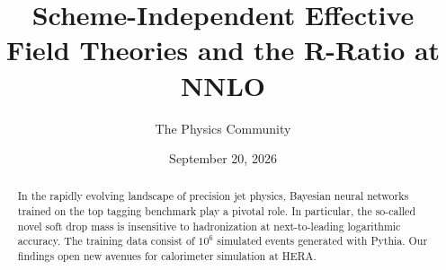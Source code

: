 \documentclass[11pt]{article}
\title{Scheme-Independent Effective Field Theories and the R-Ratio at NNLO}
\author{The Physics Community}
\date{September 20, 2026}
\numberwithin{equation}{section}
\theoremstyle{definition}
\theoremstyle{remark}
\begin{document}
\maketitle
\begin{abstract}
In the rapidly evolving landscape of precision jet physics, Bayesian
neural networks trained on the top tagging benchmark play a pivotal
role. In particular, the so-called novel soft drop mass is insensitive
to hadronization at next-to-leading logarithmic accuracy. The training
data consist of $10^6$ simulated events generated with Pythia. Our
findings open new avenues for calorimeter simulation at HERA.
\end{abstract}
\tableofcontents




\nocite{*}


\end{document}
